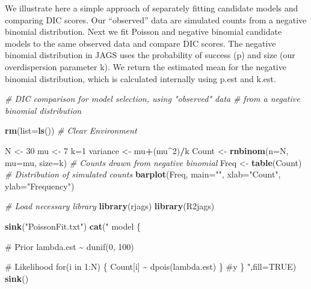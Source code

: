 \documentclass[
]{krantz}
\makeatletter
\newenvironment{Shaded}{\begin{snugshade}}{\end{snugshade}}
\newcommand{\AttributeTok}[1]{\textcolor[rgb]{0.27,0.27,0.27}{#1}}
\newcommand{\CommentTok}[1]{\textcolor[rgb]{0.37,0.37,0.37}{\textit{#1}}}
\newcommand{\ConstantTok}[1]{\textcolor[rgb]{0.37,0.37,0.37}{#1}}
\newcommand{\DecValTok}[1]{\textcolor[rgb]{0.06,0.06,0.06}{#1}}
\newcommand{\FunctionTok}[1]{\textcolor[rgb]{0.27,0.27,0.27}{\textbf{#1}}}
\newcommand{\NormalTok}[1]{#1}
\newcommand{\OtherTok}[1]{\textcolor[rgb]{0.37,0.37,0.37}{#1}}
\newcommand{\SpecialCharTok}[1]{\textcolor[rgb]{0.43,0.43,0.43}{\textbf{#1}}}
\newcommand{\StringTok}[1]{\textcolor[rgb]{0.5,0.5,0.5}{#1}}
\newenvironment{kframe}{%
\medskip{}
\setlength{\fboxsep}{.8em}
 \def\at@end@of@kframe{}%
 \ifinner\ifhmode%
  \def\at@end@of@kframe{\end{minipage}}%
  \begin{minipage}{\columnwidth}%
 \fi\fi%
 \def\FrameCommand##1{\hskip\@totalleftmargin \hskip-\fboxsep
 \colorbox{shadecolor}{##1}\hskip-\fboxsep
     \hskip-\linewidth \hskip-\@totalleftmargin \hskip\columnwidth}%
 \MakeFramed {\advance\hsize-\width
   \@totalleftmargin\z@ \linewidth\hsize
   \@setminipage}}%
 {\par\unskip\endMakeFramed%
 \at@end@of@kframe}
\renewenvironment{Shaded}{\begin{kframe}}{\end{kframe}}
\makeatother
\begin{document}
We illustrate here a simple approach of separately fitting candidate models and comparing DIC scores. Our ``observed'' data are simulated counts from a negative binomial distribution. Next we fit Poisson and negative binomial candidate models to the same observed data and compare DIC scores. The negative binomial distribution in JAGS uses the probability of success (p) and size (our overdispersion parameter k). We return the estimated mean for the negative binomial distribution, which is calculated internally using p.est and k.est.

\begin{Shaded}
\begin{Highlighting}[]
\CommentTok{\# DIC comparison for model selection, using "observed" data}
\CommentTok{\# from a negative binomial distribution}

\FunctionTok{rm}\NormalTok{(}\AttributeTok{list=}\FunctionTok{ls}\NormalTok{()) }\CommentTok{\# Clear Environment}

\NormalTok{N }\OtherTok{\textless{}{-}} \DecValTok{30}
\NormalTok{mu }\OtherTok{\textless{}{-}} \DecValTok{7}
\NormalTok{k}\OtherTok{=}\DecValTok{1}
\NormalTok{variance }\OtherTok{\textless{}{-}}\NormalTok{ mu}\SpecialCharTok{+}\NormalTok{(mu}\SpecialCharTok{\^{}}\DecValTok{2}\NormalTok{)}\SpecialCharTok{/}\NormalTok{k}
\NormalTok{Count }\OtherTok{\textless{}{-}} \FunctionTok{rnbinom}\NormalTok{(}\AttributeTok{n=}\NormalTok{N, }\AttributeTok{mu=}\NormalTok{mu, }\AttributeTok{size=}\NormalTok{k) }\CommentTok{\# Counts drawn from negative binomial}
\NormalTok{Freq }\OtherTok{\textless{}{-}} \FunctionTok{table}\NormalTok{(Count)  }\CommentTok{\# Distribution of simulated counts}
\FunctionTok{barplot}\NormalTok{(Freq, }\AttributeTok{main=}\StringTok{""}\NormalTok{, }\AttributeTok{xlab=}\StringTok{"Count"}\NormalTok{, }\AttributeTok{ylab=}\StringTok{"Frequency"}\NormalTok{)}

\CommentTok{\# Load necessary library}
\FunctionTok{library}\NormalTok{(rjags)}
\FunctionTok{library}\NormalTok{(R2jags)}

\FunctionTok{sink}\NormalTok{(}\StringTok{"PoissonFit.txt"}\NormalTok{)}
\FunctionTok{cat}\NormalTok{(}\StringTok{"}
\StringTok{model \{}

\StringTok{\# Prior}
\StringTok{ lambda.est \textasciitilde{} dunif(0, 100)}

\StringTok{\# Likelihood}
\StringTok{    for(i in 1:N) \{}
\StringTok{      Count[i] \textasciitilde{} dpois(lambda.est)}
\StringTok{      \} \#y}
\StringTok{\}}
\StringTok{    "}\NormalTok{,}\AttributeTok{fill=}\ConstantTok{TRUE}\NormalTok{)}
\FunctionTok{sink}\NormalTok{()}


\end{Highlighting}
\end{Shaded}
\end{document}
